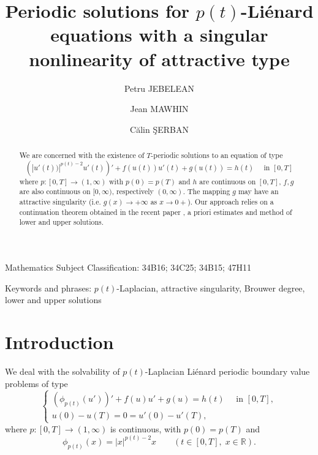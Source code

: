 \documentclass[11pt]{amsart}
\numberwithin{equation}{section} \textwidth=15.5cm
\begin{document}
\title[Periodic solutions for $p(t)$-Li\'{e}nard equations]{Periodic solutions for $p(t)$-Li\'{e}nard equations with a
singular nonlinearity of attractive type}
\author{Petru JEBELEAN}
\address{Institute for Advanced Environmental Research, West University of Timi\c{s}oara,
Blvd. V. P\^{a}rvan, no. 4, 300223  Timi\c{s}oara, Romania,
E-mail : petru.jebelean@e-uvt.ro}
\author{Jean MAWHIN}
\address{Institut de Recherche en Math\'{e}matique et Physique, Universit\'{e} Catholique de Louvain, Chemin du Cyclotron,
2, 1348 Louvain-la-Neuve, Belgium,
E-mail : jean.mawhin@uclouvain.be}
\author{C\u{a}lin \c{S}ERBAN}
\address{Department of Mathematics,
West University of Timi\c{s}oara,
Blvd. V. P\^{a}rvan, no. 4, 300223  Timi\c{s}oara, Romania, E-mail :
calin.serban@e-uvt.ro}


\begin{abstract}
\noindent We are concerned with the existence of $T$-periodic solutions to an equation of type
$$
\left (|u'(t))|^{p(t)-2} u'(t) \right )'+f(u(t))u'(t)+g(u(t))=h(t)\quad \mbox{ in }[0,T]
$$
where $p:[0,T]\to(1,\infty)$ with $p(0)=p(T)$ and $h$ are continuous on $[0,T]$, $f,g$ are also continuous on $[0,\infty)$, respectively $(0,\infty)$. The mapping $g$ may have an attractive singularity (i.e. $g(x) \to +\infty$ as $x\to 0+$). Our approach relies on a continuation theorem obtained in the recent paper \cite{[HMMT]}, a priori estimates and method of lower and upper solutions.
\end{abstract}

\maketitle

 Mathematics Subject Classification: {34B16; 34C25; 34B15; 47H11}

\noindent Keywords and phrases: {$p(t)$-Laplacian, attractive singularity, Brouwer degree, lower and upper solutions}
\bigskip

\section{Introduction}
We deal with the solvability of $p(t)$-Laplacian Li\'{e}nard periodic boundary value problems of type
\begin{equation}\label{pb1}
	\left \{
            \begin{array}{ll}
		      (\phi_{p(t)}(u'))'+f(u)u'+g(u)=h(t)\quad \mbox{ in }[0,T],\\
		      u(0)-u(T)=0=u'(0)-u'(T),
			\end{array}
\right.
\end{equation}
where $p:[0,T]\to(1,\infty)$ is continuous, with $p(0)=p(T)$ and
$$\phi_{p(t)}(x)=|x|^{p(t)-2}x \qquad (t\in [0,T], \; x\in \mathbb{R}).$$
\end{document}
